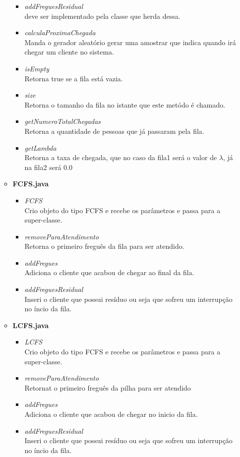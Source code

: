 \documentclass[a4paper,10pt]{article}
\begin{document}
\begin{itemize}
\begin{itemize}
\begin{itemize}
			 \item \textit{addFreguesResidual\\} deve ser implementado pela classe que herda dessa.
			 \item \textit{calculaProximaChegada\\} Manda o gerador aleatório gerar uma amostrar que indica quando irá chegar um cliente no sistema.
			 \item \textit{isEmpty\\} Retorna true se a fila está vazia.
			 \item \textit{size\\} Retorna o tamanho da fila no istante que este metódo é chamado.
			 \item \textit{getNumeroTotalChegadas\\}Retorna a quantidade de pessoas que já passaram pela fila.
			 \item \textit{getLambda \\}Retorna a taxa de chegada, que no caso da fila1 será o valor de $\lambda$, já na fila2 será $0.0$
		    \end{itemize}
		\item \textbf{FCFS.java\\}
		    \begin{itemize}
			 \item \textit{FCFS \\}Crio objeto do tipo FCFS e recebe os parâmetros e passa para a super-classe.
			 \item \textit{removeParaAtendimento\\} Retorna o primeiro freguês da fila para ser atendido.
			 \item \textit{addFregues\\} Adiciona o cliente que acabou de chegar ao final da fila.
			 \item \textit{addFreguesResidual \\} Inseri o cliente que possui resíduo ou seja que sofreu um interrupção no íncio da fila.			  
		    \end{itemize}
		\item \textbf{LCFS.java\\}
		    \begin{itemize}
			 \item \textit{LCFS \\}Crio objeto do tipo FCFS e recebe os parâmetros e passa para a super-classe.
			 \item \textit{removeParaAtendimento\\}Retornat  o primeiro freguês da pilha para ser atendido
			 \item \textit{addFregues\\}Adiciona o cliente que acabou de chegar no inicio da fila.
			 \item \textit{addFreguesResidual \\} Inseri o cliente que possui resíduo ou seja que sofreu um interrupção no íncio da fila.			  
		    \end{itemize}
	     \end{itemize}
      \end{itemize}
\end{document}
